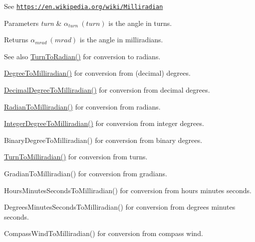 See \href{https://en.wikipedia.org/wiki/Milliradian}{\tt https\+://en.\+wikipedia.\+org/wiki/\+Milliradian} 
\begin{DoxyParams}{Parameters}
{\em turn} & $\alpha_{turn}\ (turn)$ is the angle in turns. \\
\hline
\end{DoxyParams}
\begin{DoxyReturn}{Returns}
$\alpha_{mrad}\ (mrad)$ is the angle in milliradians. 
\end{DoxyReturn}
\begin{DoxySeeAlso}{See also}
\mbox{\hyperlink{group___e_g_x_math-_angle_conversions-_turn_ga72e6d3c46ebfc25f7be5050136d8df16}{Turn\+To\+Radian()}} for conversion to radians. 

\mbox{\hyperlink{group___e_g_x_math-_angle_conversions-_degree_gae4fa6c2d3805430760783650cfbfdb11}{Degree\+To\+Milliradian()}} for conversion from (decimal) degrees. 

\mbox{\hyperlink{group___e_g_x_math-_angle_conversions-_decimal_degree_gab567d02d4692d9642a4ad219e479713a}{Decimal\+Degree\+To\+Milliradian()}} for conversion from decimal degrees. 

\mbox{\hyperlink{group___e_g_x_math-_angle_conversions-_radian_gaea391f0cca39b05e298dd1cae162e7f1}{Radian\+To\+Milliradian()}} for conversion from radians. 

\mbox{\hyperlink{group___e_g_x_math-_angle_conversions-_integer_degree_ga5379a68bdff5cc4fab5bb1ba06ef9453}{Integer\+Degree\+To\+Milliradian()}} for conversion from integer degrees. 

Binary\+Degree\+To\+Milliradian() for conversion from binary degrees. 

\mbox{\hyperlink{group___e_g_x_math-_angle_conversions-_turn_ga2aea2621472294ce4c25ac7e55db51c6}{Turn\+To\+Milliradian()}} for conversion from turns. 

Gradian\+To\+Milliradian() for conversion from gradians. 

Hours\+Minutes\+Seconds\+To\+Milliradian() for conversion from hours minutes seconds. 

Degrees\+Minutes\+Seconds\+To\+Milliradian() for conversion from degrees minutes seconds. 

Compass\+Wind\+To\+Milliradian() for conversion from compass wind. 
\end{DoxySeeAlso}
\mbox{\label{group___e_g_x_math-_angle_conversions-_turn_ga72e6d3c46ebfc25f7be5050136d8df16}} 
